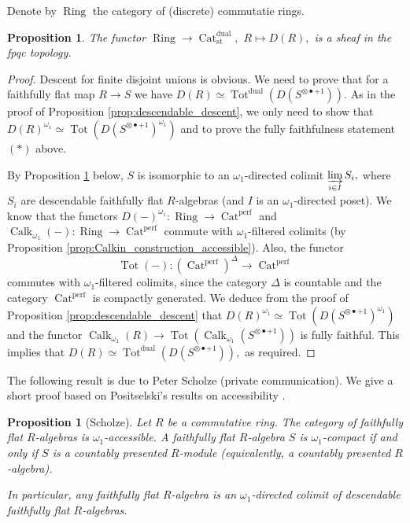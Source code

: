 \documentclass[11pt,leqno]{amsart}
\newtheorem{prop}[theo]{Proposition}
\numberwithin{equation}{section}
\newcommand{\indlim}[1][]{\mathop{\varinjlim}\limits_{#1}}
\newcommand{\Cat}{\operatorname{Cat}}
\newcommand{\Ring}{\operatorname{Ring}}
\newcommand{\st}{\operatorname{st}}
\newcommand{\dual}{\operatorname{dual}}
\newcommand{\Tot}{\operatorname{Tot}}
\newcommand{\perf}{\operatorname{perf}}
\newcommand{\Calk}{\operatorname{Calk}}
\begin{document}
Denote by $\Ring$ the category of (discrete) commutatie rings.

\begin{prop}\label{prop:fpqc_descent} The functor $\Ring\to \Cat_{\st}^{\dual},$ $R\mapsto D(R),$ is a sheaf in the fpqc topology.\end{prop}

\begin{proof} Descent for finite disjoint unions is obvious. We need to prove that for a faithfully flat map $R\to S$ we have $D(R)\simeq\Tot^{\dual}(D(S^{\otimes \bullet + 1})).$ As in the proof of Proposition \ref{prop:descendable_descent}, we only need to show that $D(R)^{\omega_1}\simeq\Tot(D(S^{\otimes\bullet+1})^{\omega_1})$ and to prove the fully faithfulness statement $(*)$ above.

By Proposition \ref{prop:Faithfully_flat_aleph_1_accessible} below, $S$ is isomorphic to an $\omega_1$-directed colimit $\indlim[i\in I]S_i,$ where $S_i$ are descendable faithfully flat $R$-algebras (and $I$ is an $\omega_1$-directed poset). We know that the functors $D(-)^{\omega_1}:\Ring\to\Cat^{\perf}$ and $\Calk_{\omega_1}(-):\Ring\to\Cat^{\perf}$ commute with $\omega_1$-filtered colimits (by Proposition \ref{prop:Calkin_construction_accessible}). Also, the functor $$\Tot(-):(\Cat^{\perf})^{\Delta}\to\Cat^{\perf}$$ commutes with $\omega_1$-filtered colimits, since the category $\Delta$ is countable and the category $\Cat^{\perf}$ is compactly generated. We deduce from the proof of Proposition \ref{prop:descendable_descent} that $D(R)^{\omega_1}\simeq\Tot(D(S^{\otimes\bullet+1})^{\omega_1})$ and the functor $\Calk_{\omega_1}(R)\to \Tot(\Calk_{\omega_1}(S^{\otimes\bullet +1}))$ is fully faithful. This implies that $D(R)\simeq\Tot^{\dual}(D(S^{\otimes \bullet + 1})),$ as required.
\end{proof}

The following result is due to Peter Scholze (private communication). We give a short proof based on Positselski's results on accessibility \cite{Pos}.

\begin{prop}[Scholze]\label{prop:Faithfully_flat_aleph_1_accessible} Let $R$ be a commutative ring. The category of faithfully flat $R$-algebras is $\omega_1$-accessible. A faithfully flat $R$-algebra $S$ is $\omega_1$-compact if and only if $S$ is a countably presented $R$-module (equivalently, a countably presented $R$-algebra).

In particular, any faithfully flat $R$-algebra is an $\omega_1$-directed colimit of descendable faithfully flat $R$-algebras.\end{prop}
\end{document}
